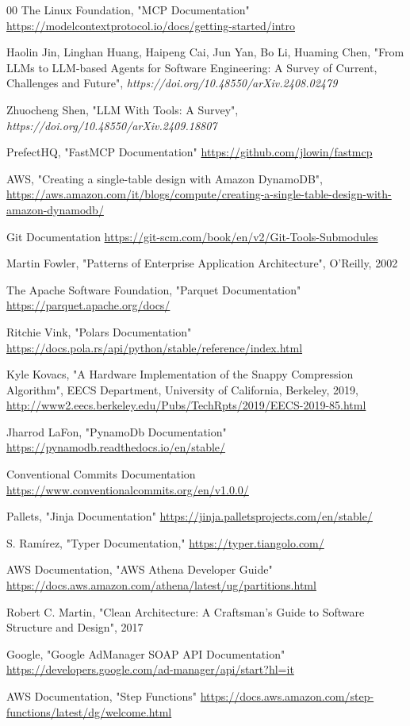 \begin{thebibliography}{00}
The Linux Foundation, "MCP Documentation"
\url{https://modelcontextprotocol.io/docs/getting-started/intro}

Haolin Jin, Linghan Huang, Haipeng Cai, Jun Yan, Bo Li, Huaming Chen, "From LLMs to LLM-based Agents for Software Engineering: A Survey of Current, Challenges and Future", \textit{
https://doi.org/10.48550/arXiv.2408.02479}

Zhuocheng Shen, "LLM With Tools: A Survey", \textit{
https://doi.org/10.48550/arXiv.2409.18807}

PrefectHQ, "FastMCP Documentation"
\url{https://github.com/jlowin/fastmcp}

AWS, "Creating a single-table design with Amazon DynamoDB",
\url{https://aws.amazon.com/it/blogs/compute/creating-a-single-table-design-with-amazon-dynamodb/}

Git Documentation
\url{https://git-scm.com/book/en/v2/Git-Tools-Submodules}

Martin Fowler, "Patterns of Enterprise Application Architecture", O'Reilly, 2002

The Apache Software Foundation, "Parquet Documentation"
\url{https://parquet.apache.org/docs/}

Ritchie Vink, "Polars Documentation"
\url{https://docs.pola.rs/api/python/stable/reference/index.html}

Kyle Kovacs, "A Hardware Implementation of the Snappy Compression Algorithm",
EECS Department, University of California, Berkeley, 2019, \url{http://www2.eecs.berkeley.edu/Pubs/TechRpts/2019/EECS-2019-85.html}

Jharrod LaFon, "PynamoDb Documentation"
\url{https://pynamodb.readthedocs.io/en/stable/}

Conventional Commits Documentation
\url{https://www.conventionalcommits.org/en/v1.0.0/}

Pallets, "Jinja Documentation"
\url{https://jinja.palletsprojects.com/en/stable/}

S. Ramírez, "Typer Documentation,"
\url{https://typer.tiangolo.com/}

AWS Documentation, "AWS Athena Developer Guide"
\url{https://docs.aws.amazon.com/athena/latest/ug/partitions.html}

Robert C. Martin, "Clean Architecture: A Craftsman's Guide to Software Structure and Design", 2017

Google, "Google AdManager SOAP API Documentation"
\url{https://developers.google.com/ad-manager/api/start?hl=it}

AWS Documentation, "Step Functions"
\url{https://docs.aws.amazon.com/step-functions/latest/dg/welcome.html}

\end{thebibliography}
% 

